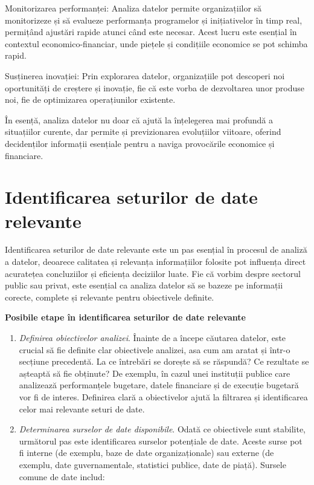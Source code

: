 \documentclass[
  11pt,
  b5paper,
  nottoc]{book}
\begin{document}
Monitorizarea performanței: Analiza datelor permite organizațiilor să
monitorizeze și să evalueze performanța programelor și inițiativelor în
timp real, permițând ajustări rapide atunci când este necesar. Acest
lucru este esențial în contextul economico-financiar, unde piețele și
condițiile economice se pot schimba rapid.

Susținerea inovației: Prin explorarea datelor, organizațiile pot
descoperi noi oportunități de creștere și inovație, fie că este vorba de
dezvoltarea unor produse noi, fie de optimizarea operațiunilor
existente.

În esență, analiza datelor nu doar că ajută la înțelegerea mai profundă
a situațiilor curente, dar permite și previzionarea evoluțiilor
viitoare, oferind decidenților informații esențiale pentru a naviga
provocările economice și financiare.

\hypertarget{identificarea-seturilor-de-date-relevante}{%
\section{Identificarea seturilor de date
relevante}\label{identificarea-seturilor-de-date-relevante}}

Identificarea seturilor de date relevante este un pas esențial în
procesul de analiză a datelor, deoarece calitatea și relevanța
informațiilor folosite pot influența direct acuratețea concluziilor și
eficiența deciziilor luate. Fie că vorbim despre sectorul public sau
privat, este esențial ca analiza datelor să se bazeze pe informații
corecte, complete și relevante pentru obiectivele definite.

\textbf{Posibile etape în identificarea seturilor de date relevante}

\begin{enumerate}
\def\labelenumi{\arabic{enumi}.}
\item
  \emph{Definirea obiectivelor analizei}. Înainte de a începe căutarea
  datelor, este crucial să fie definite clar obiectivele analizei, asa
  cum am aratat și într-o secțiune precedentă. La ce întrebări se
  dorește să se răspundă? Ce rezultate se așteaptă să fie obținute? De
  exemplu, în cazul unei instituții publice care analizează
  performanțele bugetare, datele financiare și de execuție bugetară vor
  fi de interes. Definirea clară a obiectivelor ajută la filtrarea și
  identificarea celor mai relevante seturi de date.
\item
  \emph{Determinarea surselor de date disponibile}. Odată ce obiectivele
  sunt stabilite, următorul pas este identificarea surselor potențiale
  de date. Aceste surse pot fi interne (de exemplu, baze de date
  organizaționale) sau externe (de exemplu, date guvernamentale,
  statistici publice, date de piață). Sursele comune de date includ:\\
\end{enumerate}
\end{document}
